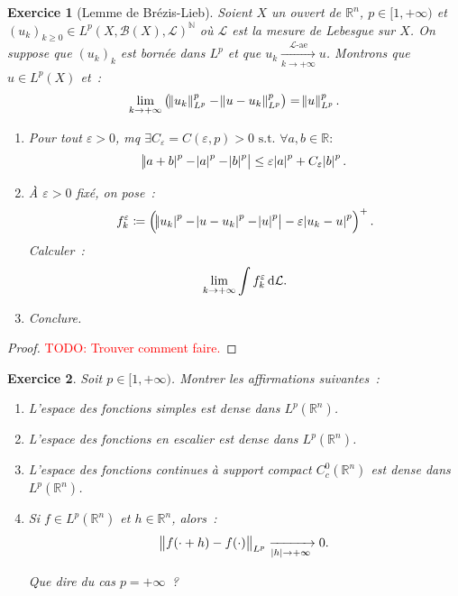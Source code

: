 \documentclass{article}
\newtheorem{ex}{Exercice}[section]
\newcommand{\TODO}[1]{\textcolor{red}{TODO: #1}}
\newcommand{\pinfty}{{+\infty}}
\newcommand{\st}{\text{ s.t. }}
\newcommand{\N}{{\mathbb N}}
\newcommand{\R}{{\mathbb R}}
\begin{document}
\begin{ex}[Lemme de Brézis-Lieb] Soient $X$ un ouvert de $\R^n$, $p \in [1, \pinfty)$ et $(u_k)_{k \geq 0} \in {L^p(X, \mathcal B(X), \mathcal L)}^\N$ où $\mathcal L$
est la mesure de Lebesgue sur $X$. On suppose que $(u_k)_k$ est bornée dans $L^p$ et que $u_k \xrightarrow[k \to \pinfty]{\mathcal L\text{-ae}} u$.
Montrons que $u \in L^p(X)$ et~:
\[\lim_{k \to \pinfty}\left(\norm {u_k}_{L^p}^p - \norm {u-u_k}_{L^p}^p\right) = \norm u_{L^p}^p.\]

\begin{enumerate}
	\item Pour tout $\varepsilon > 0$, mq $\exists C_\varepsilon = C(\varepsilon, p) > 0 \st \forall a, b \in \R :$
	\[\abs {\abs {a+b}^p - \abs a^p - \abs b^p} \leq \varepsilon\abs a^p + C_\varepsilon\abs b^p.\]

	\item À $\varepsilon > 0$ fixé, on pose~:
	\[f_k^\varepsilon \coloneqq \left(\abs {\abs {u_k}^p - \abs {u-u_k}^p - \abs u^p} - \varepsilon\abs {u_k-u}^p\right)^+.\]
	Calculer~:
	\[\lim_{k \to \pinfty}\int f_k^\varepsilon\dif\mathcal L.\]

	\item Conclure.
\end{enumerate}
\end{ex}

\begin{proof}
	\TODO{Trouver comment faire.}
\end{proof}

\begin{ex} Soit $p \in [1, \pinfty)$. Montrer les affirmations suivantes~:
\begin{enumerate}
	\item L'espace des fonctions simples est dense dans $L^p(\R^n)$.
	\item L'espace des fonctions en escalier est dense dans $L^p(\R^n)$.
	\item L'espace des fonctions continues à support compact $C^0_c(\R^n)$ est dense dans $L^p(\R^n)$.
	\item Si $f \in L^p(\R^n)$ et $h \in \R^n$, alors~:
	\[\norm {f(\cdot+h)-f(\cdot)}_{L^p} \xrightarrow[\abs h \to \pinfty]{} 0.\]

	Que dire du cas $p = \pinfty$~?
\end{enumerate}
\end{ex}
\end{document}
